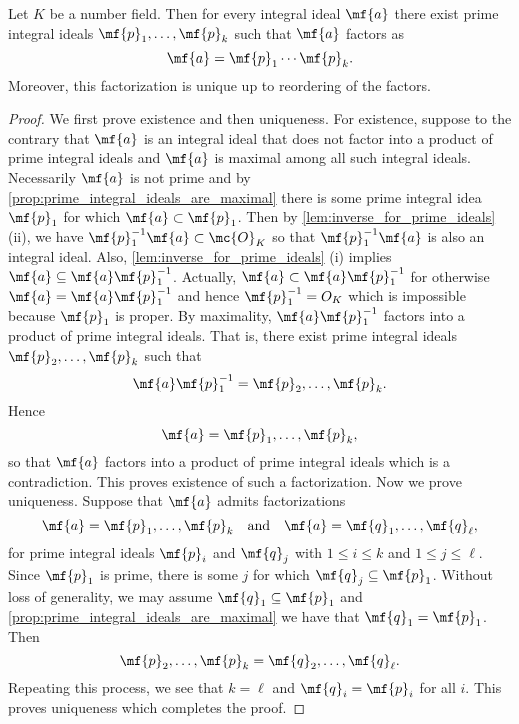     \begin{theorem}\label{thm:unique_product_prime_ideals}
      Let $K$ be a number field. Then for every integral ideal $\mf{a}$ there exist prime integral ideals $\mf{p}_{1},\ldots,\mf{p}_{k}$ such that $\mf{a}$ factors as
      \[
        \mf{a} = \mf{p}_{1} \cdots \mf{p}_{k}.
      \]
      Moreover, this factorization is unique up to reordering of the factors.
    \end{theorem}
    \begin{proof}
      We first prove existence and then uniqueness. For existence, suppose to the contrary that $\mf{a}$ is an integral ideal that does not factor into a product of prime integral ideals and $\mf{a}$ is maximal among all such integral ideals. Necessarily $\mf{a}$ is not prime and by \cref{prop:prime_integral_ideals_are_maximal} there is some prime integral idea $\mf{p}_{1}$ for which $\mf{a} \subset \mf{p}_{1}$. Then by \cref{lem:inverse_for_prime_ideals} (ii), we have $\mf{p}_{1}^{-1}\mf{a} \subset \mc{O}_{K}$ so that $\mf{p}_{1}^{-1}\mf{a}$ is also an integral ideal. Also, \cref{lem:inverse_for_prime_ideals} (i) implies $\mf{a} \subseteq \mf{a}\mf{p}_{1}^{-1}$. Actually, $\mf{a} \subset \mf{a}\mf{p}_{1}^{-1}$ for otherwise $\mf{a} = \mf{a}\mf{p}_{1}^{-1}$ and hence $\mf{p}_{1}^{-1} = {O}_{K}$ which is impossible because $\mf{p}_{1}$ is proper. By maximality, $\mf{a}\mf{p}_{1}^{-1}$ factors into a product of prime integral ideals. That is, there exist prime integral ideals $\mf{p}_{2},\ldots,\mf{p}_{k}$ such that
      \[
        \mf{a}\mf{p}_{1}^{-1} = \mf{p}_{2},\ldots,\mf{p}_{k}.
      \]
      Hence
      \[
        \mf{a} = \mf{p}_{1},\ldots,\mf{p}_{k},
      \]
      so that $\mf{a}$ factors into a product of prime integral ideals which is a contradiction. This proves existence of such a factorization. Now we prove uniqueness. Suppose that $\mf{a}$ admits factorizations
      \[
        \mf{a} = \mf{p}_{1},\ldots,\mf{p}_{k} \quad \text{and} \quad \mf{a} = \mf{q}_{1},\ldots,\mf{q}_{\ell},
      \]
      for prime integral ideals $\mf{p}_{i}$ and $\mf{q}_{j}$ with $1 \le i \le k$ and $1 \le j \le \ell$. Since $\mf{p}_{1}$ is prime, there is some $j$ for which $\mf{q}_{j} \subseteq \mf{p}_{1}$. Without loss of generality, we may assume $\mf{q}_{1} \subseteq \mf{p}_{1}$ and \cref{prop:prime_integral_ideals_are_maximal} we have that $\mf{q}_{1} = \mf{p}_{1}$. Then
      \[
        \mf{p}_{2},\ldots,\mf{p}_{k} = \mf{q}_{2},\ldots,\mf{q}_{\ell}.
      \]
      Repeating this process, we see that $k = \ell$ and $\mf{q}_{i} = \mf{p}_{i}$ for all $i$. This proves uniqueness which completes the proof.
    \end{proof}

